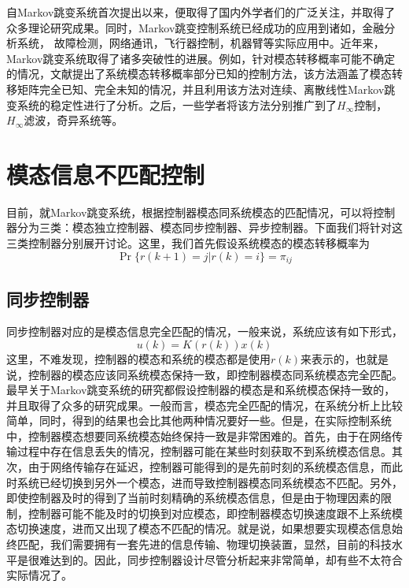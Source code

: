 	自Markov跳变系统首次提出以来\cite{florentin1961optimal}，便取得了国内外学者们的广泛关注，并取得了众多理论研究成果\cite{costa2006discrete,de2000output,xiong2005robust,ma2010stability,zhang2009hestimation,xu2007delay}。同时，Markov跳变控制系统已经成功的应用到诸如，金融分析系统\cite{mamon2007hidden}， 故障检测\cite{zhong2005faultdetection}，网络通讯\cite{network-communication-kim2004}，飞行器控制\cite{bar1993estimation,gray2000stability}，机器臂\cite{goncalves2004nonlinear}等实际应用中。近年来，Markov跳变系统取得了诸多突破性的进展。例如，针对模态转移概率可能不确定的情况，文献\cite{zhang2009stability}提出了系统模态转移概率部分已知的控制方法，该方法涵盖了模态转移矩阵完全已知、完全未知的情况，并且利用该方法对连续、离散线性Markov跳变系统的稳定性进行了分析。之后，一些学者将该方法分别推广到了$H_{\infty}$控制\cite{luan2012h}，$H_\infty$滤波\cite{ma2009robust}，奇异系统\cite{kao2014stabilization}等。

\section{模态信息不匹配控制}
	目前，就Markov跳变系统，根据控制器模态同系统模态的匹配情况，可以将控制器分为三类：模态独立控制器、模态同步控制器、异步控制器。下面我们将针对这三类控制器分别展开讨论。这里，我们首先假设系统模态的模态转移概率为
	\begin{equation}\label{introduction-tps-sys}
		\Pr\{r(k+1)=j|r(k)=i \}=\pi_{ij}
	\end{equation}
	\subsection{同步控制器}
	同步控制器对应的是模态信息完全匹配的情况，一般来说，系统应该有如下形式，
	\begin{equation}
		u(k)=K(r(k))x(k)
	\end{equation}
	这里，不难发现，控制器的模态和系统的模态都是使用$r(k)$来表示的，也就是说，控制器的模态应该同系统模态保持一致，即控制器模态同系统模态完全匹配。最早关于Markov跳变系统的研究都假设控制器的模态是和系统模态保持一致的，并且取得了众多的研究成果。一般而言，模态完全匹配的情况，在系统分析上比较简单，同时，得到的结果也会比其他两种情况要好一些。但是，在实际控制系统中，控制器模态想要同系统模态始终保持一致是非常困难的。首先，由于在网络传输过程中存在信息丢失的情况，控制器可能在某些时刻获取不到系统模态信息。其次，由于网络传输存在延迟，控制器可能得到的是先前时刻的系统模态信息，而此时系统已经切换到另外一个模态，进而导致控制器模态同系统模态不匹配。另外，即使控制器及时的得到了当前时刻精确的系统模态信息，但是由于物理因素的限制，控制器可能不能及时的切换到对应模态，即控制器模态切换速度跟不上系统模态切换速度，进而又出现了模态不匹配的情况。就是说，如果想要实现模态信息始终匹配，我们需要拥有一套先进的信息传输、物理切换装置，显然，目前的科技水平是很难达到的。因此，同步控制器设计尽管分析起来非常简单，却有些不太符合实际情况了。
	
